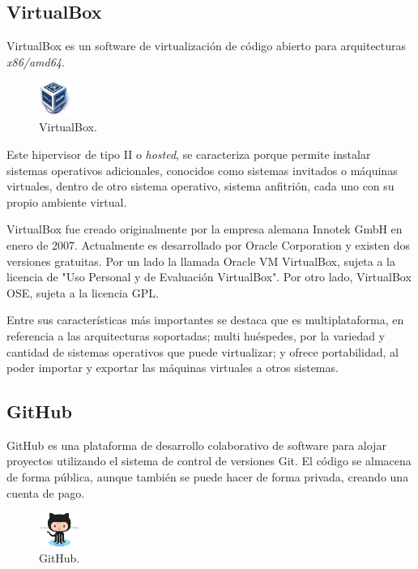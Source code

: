 \subsection{VirtualBox}

VirtualBox\cite{vagrantboxes} es un software de virtualización de código abierto para arquitecturas \textit{x86/amd64}. 

\begin{figure}[H]
\centering
\includegraphics[width=0.1\textwidth]{images/figures/virtualbox.png}
\caption{VirtualBox.\footnotemark}
\end{figure}


Este hipervisor de tipo II o \textit{hosted}, se caracteriza porque permite instalar sistemas operativos adicionales, conocidos como sistemas invitados o máquinas virtuales, dentro de otro sistema operativo, sistema anfitrión, cada uno con su propio ambiente virtual.

VirtualBox fue creado originalmente por la empresa alemana Innotek GmbH en enero de 2007. Actualmente es desarrollado por Oracle Corporation y existen dos versiones gratuitas. Por un lado la llamada Oracle VM VirtualBox, sujeta a la licencia de "Uso Personal y de Evaluación VirtualBox". Por otro lado, VirtualBox OSE, sujeta a la licencia GPL.

Entre sus características más importantes se destaca que es multiplataforma, en referencia a las arquitecturas soportadas; multi huéspedes, por la variedad y cantidad de sistemas operativos que puede virtualizar; y ofrece portabilidad, al poder importar y exportar las máquinas virtuales a otros sistemas.

\subsection{GitHub}

GitHub\cite{GitHub} es una plataforma de desarrollo colaborativo de software para alojar proyectos utilizando el sistema de control de versiones Git. El código se almacena de forma pública, aunque también se puede hacer de forma privada, creando una cuenta de pago.

\begin{figure}[H]
\centering
\includegraphics[width=0.12\textwidth]{images/figures/github.png}
\caption{GitHub.\footnotemark}
\end{figure}

